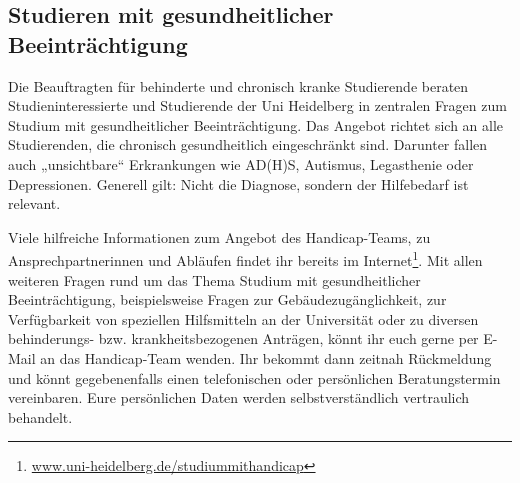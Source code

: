 \subsection{Studieren mit gesundheitlicher Beeinträchtigung}
Die Beauftragten für behinderte und chronisch kranke Studierende beraten Studieninteressierte und Studierende der Uni Heidelberg in zentralen Fragen zum Studium mit gesundheitlicher Beeinträchtigung.
Das Angebot richtet sich an alle Studierenden, die chronisch gesundheitlich eingeschränkt sind. Darunter fallen auch „unsichtbare“ Erkrankungen wie AD(H)S, Autismus, Legasthenie oder Depressionen. Generell gilt: Nicht die Diagnose, sondern der Hilfebedarf ist relevant.

Viele hilfreiche Informationen zum Angebot des Handicap-Teams, zu Ansprechpartnerinnen und Abläufen findet ihr bereits im Internet\footnote{\url{www.uni-heidelberg.de/studiummithandicap}}. Mit allen weiteren Fragen rund um das Thema Studium mit gesundheitlicher Beeinträchtigung, beispielsweise Fragen zur Gebäudezugänglichkeit,  zur Verfügbarkeit von speziellen Hilfsmitteln an der Universität oder zu diversen behinderungs- bzw. krankheitsbezogenen Anträgen, könnt ihr euch gerne per E-Mail an das Handicap-Team wenden. Ihr bekommt dann zeitnah Rückmeldung und könnt gegebenenfalls einen telefonischen oder persönlichen Beratungstermin vereinbaren.
Eure persönlichen Daten werden selbstverständlich vertraulich behandelt.
